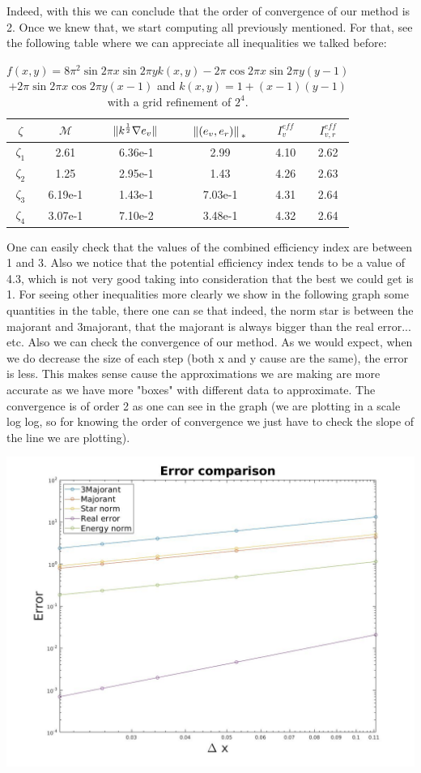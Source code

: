 \documentclass{article}
\begin{document}
	Indeed, with this we can conclude that the order of convergence of our method is 2. Once we knew that, we start computing all previously mentioned. For that, see the following table where we can appreciate all inequalities we talked before:
	\begin{table}[h!]
		\centering
		\begin{tabular}{c | c | c | c | c | c }
			$\zeta$ & $\mathcal{M}$  & $\norm*{k^{\frac{1}{2}}\nabla e_v}$ & $\norm*{(e_v,e_r)}_{*}$ & $I_v^{eff}$ & $I_{v,r}^{eff}$ \\
			\hline \hline
			$\zeta_1$ & 2.61 & 6.36e-1 & 2.99 & 4.10 & 2.62 \\ 
			$\zeta_2$ & 1.25 & 2.95e-1 & 1.43 & 4.26 & 2.63 \\
			$\zeta_3$ & 6.19e-1 & 1.43e-1& 7.03e-1 & 4.31 & 2.64 \\
			$\zeta_4$ & 3.07e-1 & 7.10e-2 & 3.48e-1 & 4.32 & 2.64 \\
		\end{tabular}
		\caption{$f(x,y) = 8\pi^2\sin{2\pi x}\sin{2\pi y}k(x,y) - 2\pi\cos{2\pi x}\sin{2\pi y}(y-1)$ $+ 2\pi\sin{2\pi x}\cos{2\pi y}(x-1) $ and 
		$k(x,y) = 1 + (x-1)(y-1)$ with a grid refinement of $2^4$.}
	\end{table}
	
	One can easily check that the values of the combined efficiency index are between 1 and 3. Also we notice that the potential efficiency index tends to be a value of 4.3, which is not very good taking into consideration that the best we could get is 1. 
	For seeing other inequalities more clearly we show in the following graph some quantities in the table, there one can se that indeed, the norm star is between the majorant and 3majorant, that the majorant is always bigger than the real error... etc. Also we can check the convergence of our method. As we would expect, when we do decrease the size of each step (both x and y cause are the same), the error is less. This makes sense cause the approximations we are making are more accurate as we have more "boxes" with different data to approximate. The convergence is of order 2 as one can see in the graph (we are plotting in a scale log log, so for knowing the order of convergence we just have to check the slope of the line we are plotting). 
	\begin{center}
		\includegraphics[width = 0.7\linewidth]{../Images/errorcomparison2d.jpg}
	\end{center}
	
\end{document}
